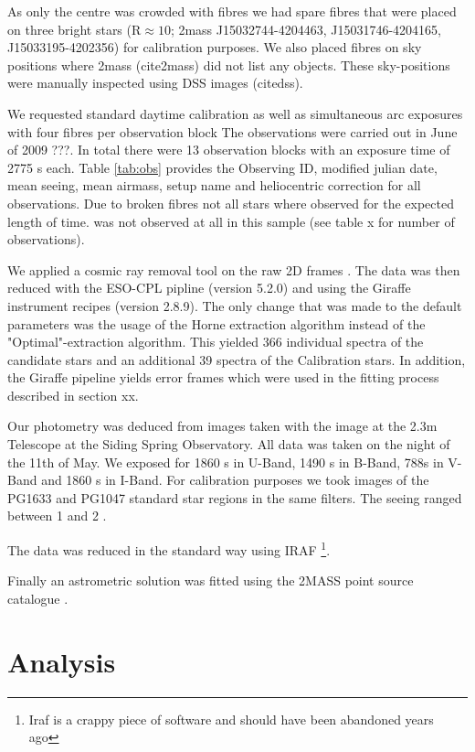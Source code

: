 As only the centre was crowded with fibres we had spare fibres that were placed on three bright stars (R$\approx 10$; 2mass J15032744-4204463, J15031746-4204165, J15033195-4202356) for calibration purposes. We also placed fibres on sky positions where 2mass (cite2mass) did not list any objects. These sky-positions were manually inspected using DSS images (citedss). 

We requested standard daytime calibration as well as simultaneous arc exposures with four fibres per observation block 
The observations were carried out in June of 2009 ???. In total there were 13 observation blocks with an exposure time of 2775 s each. Table \ref{tab:obs} provides the Observing ID, modified julian date, mean seeing, mean airmass, setup name and heliocentric correction for all observations. 
Due to broken fibres not all stars where observed for the expected length of time.  was not observed at all in this sample (see table x for number of observations).

We applied a cosmic ray removal tool on the raw 2D frames \citep{2001PASP..113.1420V}. 
The data was then reduced with the ESO-CPL pipline (version 5.2.0) and using the Giraffe instrument recipes (version 2.8.9). The only change that was made to the default parameters was the usage of the Horne extraction algorithm instead of the "Optimal"-extraction algorithm. This yielded 366 individual spectra of the candidate stars and an additional 39 spectra of the Calibration stars. 
In addition,  the Giraffe pipeline yields error frames which were used in the fitting process described in section xx. 
%

Our photometry was deduced from images taken with the image at the 2.3m Telescope at the Siding Spring Observatory. All data was taken on the night of the 11th of May. We exposed for 1860 s in U-Band, 1490 s in B-Band, 788s in V-Band and 1860 s in I-Band. For calibration purposes we took images of the PG1633 and PG1047 standard star regions in the same filters. The seeing ranged between 1 and 2 \arcsec. 

The data was reduced in the standard way using IRAF \footnote{Iraf is a crappy piece of software and should have been abandoned years ago}.

Finally an astrometric solution was fitted using the 2MASS point source catalogue \citep{2006AJ....131.1163S}. 


\section{Analysis}
